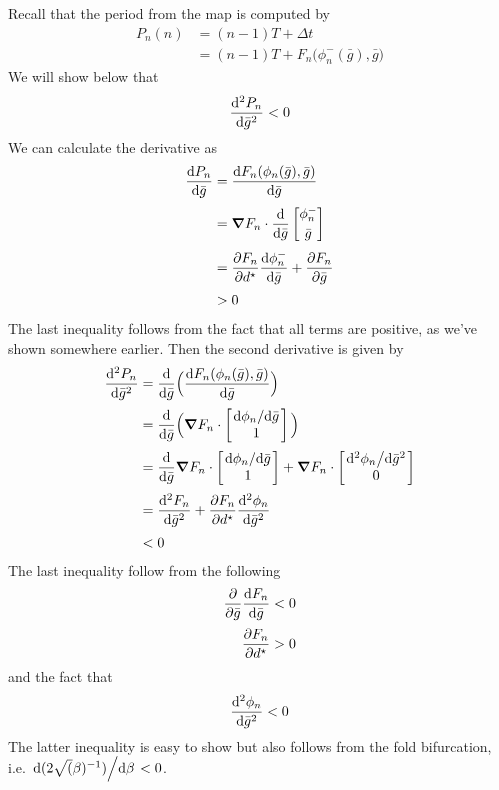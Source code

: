 \documentclass[12pt,authoryear]{elsarticle}
\newcommand{\dstar}{d^\star}
\newcommand{\gbar}{\bar g}
\newcommand{\phin}{\phi_n}
\newcommand{\delt}{\Delta t}
\newcommand{\F}{F_n}
\begin{document}
Recall that the period from the map is computed by
\begin{align}
  P_{n}(n)&= (n-1)T + \delt\\
          &= (n-1)T + F_{n}\big(\phin^{-}(\gbar), \gbar\big)
\end{align}
We will show below that
\begin{equation}
  \dv[2]{P_{n}}{\gbar} < 0
\end{equation}
We can calculate the derivative as
\begin{align}
  \dv{P_{n}}{\gbar} &= \dv{F_{n}(\phin(\gbar), \gbar)}{\gbar} \\[0.5ex]
                    &= \grad F_{n} \cdot \dv{\gbar}\begin{bmatrix}\phin^{-}\\[0.5ex] \gbar\end{bmatrix}\\[0.5ex]
                    &= \pdv{\F}{\dstar}\dv{\phin^{-}}{\gbar} + \pdv{\F}{\gbar}\\[0.5ex]
                    &>0
\end{align}
The last inequality follows from the fact that all terms are positive, as we've shown somewhere earlier.
Then the second derivative is given by
\begin{align}
  \dv[2]{P_{n}}{\gbar}&=\dv{\gbar}\Big(\dv{F_{n}(\phin(\gbar), \gbar)}{\gbar} \Big)\\[0.5ex]
                      &=\dv{\gbar}\Big(\grad F_{n} \cdot \begin{bmatrix}\dv*{\phin}{\gbar}\\1 \end{bmatrix}\Big)\\[0.5ex]
                      &= \dv{\gbar}\grad F_{n} \cdot \begin{bmatrix}\dv*{\phin}{\gbar}\\ 1\end{bmatrix} + \grad F_{n}\cdot \begin{bmatrix}\dv*[2]{\phin}{\gbar}\\0\end{bmatrix}\\[0.5ex]
  &=\dv[2]{F_{n}}{\gbar} + \pdv{F_{n}}{\dstar}\dv[2]{\phin}{\gbar}\\[0.5ex]
  &< 0
\end{align}
The last inequality follow from the following
\begin{align}
  \pdv{\gbar}\dv{F_{n}}{\gbar}<0\\[0.5ex]
  \pdv{F_{n}}{\dstar}>0
\end{align}
and the fact that
\begin{equation}
  \dv[2]{\phin}{\gbar}<0
\end{equation}
The latter inequality is easy to show but also follows from the fold bifurcation, i.e. $\dv*{(2\sqrt(\beta)^{-1})}{\beta}<0$.
\end{document}

